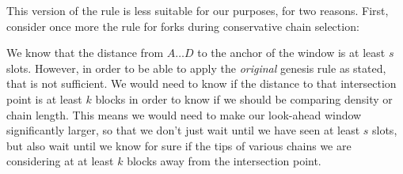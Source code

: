 This version of the rule is less suitable for our purposes, for two reasons.
First, consider once more the rule for forks during conservative chain
selection:
%
\begin{center}
\end{center}
%
We know that the distance from $A \ldots D$ to the anchor of the window is at
least $s$ slots. However, in order to be able to apply the \emph{original}
genesis rule as stated, that is not sufficient. We would need to know if the
distance to that intersection point is at least $k$ blocks in order to know
if we should be comparing density or chain length. This means we would need to
make our look-ahead window significantly larger, so that we don't just wait
until we have seen at least $s$ slots, but also wait until we know for sure
if the tips of various chains we are considering at at least $k$ blocks away
from the intersection point.

